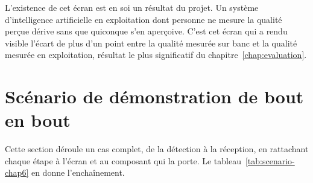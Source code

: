 L'existence de cet écran est en soi un résultat du projet. Un système d'intelligence artificielle en exploitation dont personne ne mesure la qualité perçue dérive sans que quiconque s'en aperçoive. C'est cet écran qui a rendu visible l'écart de plus d'un point entre la qualité mesurée sur banc et la qualité mesurée en exploitation, résultat le plus significatif du chapitre~\ref{chap:evaluation}.

\section{Scénario de démonstration de bout en bout}
\label{sec:scenario}

Cette section déroule un cas complet, de la détection à la réception, en rattachant chaque étape à l'écran et au composant qui la porte. Le tableau~\ref{tab:scenario-chap6} en donne l'enchaînement.

\begingroup
\setlength{\tabcolsep}{3pt}
\renewcommand{\arraystretch}{1.15}
\small

